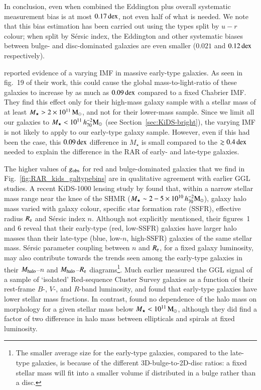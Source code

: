 \documentclass{aa}
\newcommand{\hmsun}{\,h_{70}^{-2} {\rm M_\odot}}
\newcommand{\msun}{\,{\rm M_\odot}}
\newcommand{\dex}{\,{\rm dex}}
\newcommand*{\E}[1]{\times 10^{#1}}
\newcommand{\un}[1]{_{\rm #1}}
\begin{document}
In conclusion, even when combined the Eddington plus overall systematic measurement bias is at most $0.17 \dex$, not even half of what is needed. We note that this bias estimation has been carried out using the types split by $u-r$ colour; when split by S\'ersic index, the Eddington and other systematic biases between bulge- and disc-dominated galaxies are even smaller ($0.021$ and $0.12 \dex$ respectively).

\cite{sanchez2019} reported evidence of a varying IMF in massive early-type galaxies. As seen in fig.~19 of their work, this could cause the global mass-to-light-ratio of these galaxies to increase by as much as $0.09 \dex$ compared to a fixed Chabrier IMF. They find this effect only for their high-mass galaxy sample with a stellar mass of at least $M_\star > 2\times10^{11} \msun$, and not for their lower-mass sample. Since we limit all our galaxies to $M_\star < 10^{11} \hmsun$ (see Section~\ref{sec:KiDS-bright}), the varying IMF is not likely to apply to our early-type galaxy sample. However, even if this had been the case, this $0.09 \dex$ difference in $M_\star$ is small compared to the $\gtrsim 0.4 \dex$ needed to explain the difference in the RAR of early- and late-type galaxies.

The higher values of $g\un{obs}$ for red and bulge-dominated galaxies that we find in Fig.~\ref{fig:RAR_kids_galtypebins} are in qualitative agreement with earlier GGL studies. A recent KiDS-1000 lensing study by \cite{taylor2020} found that, within a narrow stellar mass range near the knee of the SHMR ($M_\star \sim 2-5\E{10} \hmsun$), galaxy halo mass varied with galaxy colour, specific star formation rate (SSFR), effective radius $R\un{e}$ and Sérsic index $n$. Although not explicitly mentioned, their figures~1 and 6 reveal that their early-type (red, low-SSFR) galaxies have larger halo masses than their late-type (blue, low-$n$, high-SSFR) galaxies of the same stellar mass. S\'ersic parameter coupling between $n$ and $R_{\rm e}$, for a fixed galaxy luminosity, may also contribute towards the trends seen among the early-type galaxies in their $M_{\rm halo}$--$n$ and $M_{\rm halo}$--$R_{\rm e}$ diagrams\footnote{The smaller average size for the early-type galaxies, compared to the late-type galaxies, is because of the different 3D-bulge-to-2D-disc ratios: a fixed stellar mass will fit into a smaller volume if distributed in a bulge rather than a disc.}. Much earlier \cite{hoekstra2005} measured the GGL signal of a sample of `isolated' Red-sequence Cluster Survey galaxies as a function of their rest-frame $B$-, $V$-, and $R$-band luminosity, and found that early-type galaxies have lower stellar mass fractions. In contrast, \mbox{\cite{mandelbaum2006}} found no dependence of the halo mass on morphology for a given stellar mass below $M_\star<10^{11} \msun$, although they did find a factor of two difference in halo mass between ellipticals and spirals at fixed luminosity.
\end{document}

